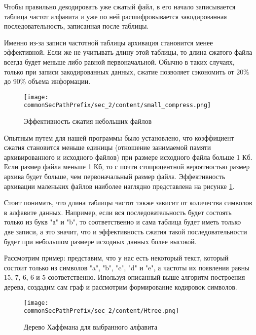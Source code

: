 Чтобы правильно декодировать уже сжатый файл, в его начало записывается таблица частот алфавита и уже по ней расшифровывается закодированная последовательность, записанная после таблицы.



Именно из-за записи частотной таблицы архивация становится менее эффективной. 
Если же не учитывать длину этой таблицы, то длина сжатого файла всегда будет меньше либо равной первоначальной.
Обычно в таких случаях, только при записи закодированных данных, сжатие позволяет сэкономить от 20\% до 90\% объема информации.



\begin{figure}[h]
    \centering
    \texttt{[image: \\commonSecPathPrefix/sec\_2/content/small\_compress.png]}
    \caption{Эффективность сжатия небольших файлов}
    \label{fig:compress}
\end{figure}



Опытным путем для нашей программы было установлено, что коэффициент сжатия становится меньше единицы (отношение занимаемой памяти архивированного и исходного файлов) при размере исходного файла больше 1 Кб.
Если размер файла меньше 1 Кб, то с почти стопроцентной вероятностью размер архива будет больше, чем первоначальный размер файла.
Эффективность архивации маленьких файлов наиболее наглядно представлена на рисунке \ref{fig:compress}.



Стоит понимать, что длина таблицы частот также зависит от количества символов в алфавите данных.
Например, если вся последовательность будет состоять только из букв "а" и "b", то соответственно и сама таблица будет иметь только две записи, а это значит, что и эффективность сжатия такой последовательности будет при небольшом размере исходных данных более высокой.



Рассмотрим пример: представим, что у нас есть некоторый текст, который состоит только из символов "a", "b", "c", "d" и "e", а частоты их появления равны 15, 7, 6, 6 и 5 соответственно. 
Ипользуя описанный выше алгоритм построения дерева, создадим сам граф и рассмотрим формирование кодировок символов.

\begin{figure}[h]
    \centering
    \texttt{[image: \\commonSecPathPrefix/sec\_2/content/Htree.png]}
    \caption{Дерево Хаффмана для выбранного алфавита}
    \label{fig:htree}
\end{figure}



